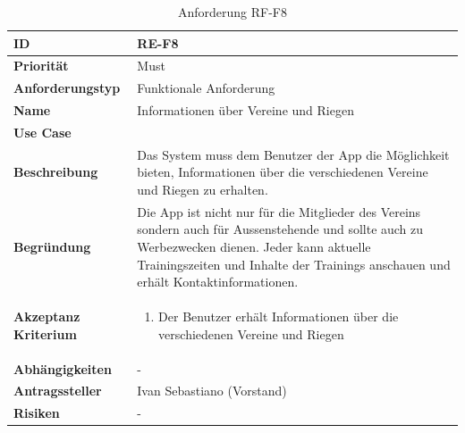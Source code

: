 \begin{table}[ht]
\centering
  \begin{tabular}{ l | p{8cm} }
	\hline
	\rowcolor{gray}
	\textbf{ID} 			&	\textbf{RE-F8}\\ \hline
	\textbf{Priorität} 		&	Must\\ \hline
	\textbf{Anforderungstyp}	&	Funktionale Anforderung\\ \hline
	\textbf{Name} 			&	Informationen über Vereine und Riegen\\ \hline
	\textbf{Use Case} 		&	\nameref{table:use_case_6}\\ \hline
	\textbf{Beschreibung} 	&	Das System muss dem Benutzer der App die Möglichkeit bieten, Informationen über die verschiedenen Vereine und Riegen zu erhalten.\\ \hline
	\textbf{Begründung} 		&	Die App ist nicht nur für die Mitglieder des Vereins sondern auch für Aussenstehende und sollte auch zu Werbezwecken dienen. Jeder kann aktuelle Trainingszeiten und Inhalte der Trainings anschauen und erhält Kontaktinformationen.\\ \hline
	\textbf{Akzeptanz Kriterium}	&	\begin{enumerate}
					\item Der Benutzer erhält Informationen über die verschiedenen Vereine und Riegen
					\end{enumerate}
					\\ \hline
	\textbf{Abhängigkeiten} 	&	-\\ \hline
	\textbf{Antragssteller} 	&	Ivan Sebastiano (Vorstand)\\ \hline
	\textbf{Risiken}	 	&	-
  \end{tabular}
   \caption{Anforderung RF-F8}\label{table:req_8}
\end{table}

